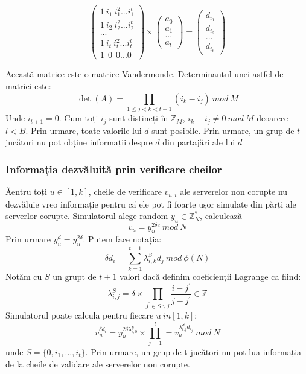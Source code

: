 \documentclass[12]{report}
\begin{document}
\[
\left (
\begin{array}{cc}
1 \ i_1 \ i_{1}^{2} ... i_{1}^{t} \\
1 \ i_2 \ i_{2}^{2} ... i_{2}^{t} \\
... \\
1 \ i_t \ i_{t}^{2} ... i_{t}^{t} \\
1 \ \ 0 \ \ 0 ... 0 


\end{array}
\right) 
\times
\left (
\begin{array}{c}
a_0 \\
a_1 \\
... \\
a_t  
\end{array}
\right)
=
\left(
\begin{array}{c}
d_{i_1} \\
d_{i_2} \\
... \\
d_{i_t}
\end{array}
\right)
\]

Această matrice este o matrice Vandermonde. Determinantul unei astfel de matrici este:
$$ \det(A) = \prod_{1 \leqslant j < k <t+1}^{} (i_k - i_j) \ mod \ M$$
Unde $i_{t+1} = 0$. Cum toți $i_j$ sunt distincți în $\mathbb{Z}_{M}$, $i_k - i_j \neq 0 \ mod \ M$ deoarece $l < B$. Prin urmare, toate valorile lui $d$ sunt posibile. Prin urmare, un grup de $t$ jucători nu pot obține informații despre $d$ din partajări ale lui $d$

\subsubsection{Informația dezvăluită prin verificare cheilor}
Ăentru toți $u \in [1,k]$, cheile de verificare $v_{u,i}$ ale serverelor non corupte nu dezvăluie vreo informație pentru că ele pot fi foarte ușor simulate din părți ale serverlor corupte. Simulatorul alege random $y_u \in \mathbb{Z}_{N}^{*}$, calculează 
$$v_u = y_{u}^{2 \delta e} \ mod \ N$$ 
Prin urmare $y_{u}^{d} = y_{u}^{2 \delta}$. Putem face notația: 
$$\delta d_i = \sum_{k=1}^{t+1} \lambda_{i,k}^{S} d_j \ mod \ \phi(N)$$
Notăm cu $S$ un grupt de $t+1$ valori dacă definim coeficienții Lagrange ca fiind:
$$\lambda_{i,j}^{S} = \delta \times \prod_{j^{'} \in S \smallsetminus j}^{} \frac{i - j^{'}}{j - j^{'}} \in \mathbb{Z}  $$
Simulatorul poate calcula pentru fiecare $u \ in [1,k]$:
$$v_{u}^{\delta d_i} = y_{u}^{2 \delta \lambda_{i,0}^{S}}  \times \prod_{j=1}^{t} = v_{u}^{\lambda_{i.j}^{S} d_{i_j}    } \ mod \ N     $$
unde $S = \lbrace 0,i_1,...,i_t \rbrace$. Prin urmare, un grup de t jucători nu pot lua informația de la cheile de validare ale serverelor non corupte.
\end{document}
